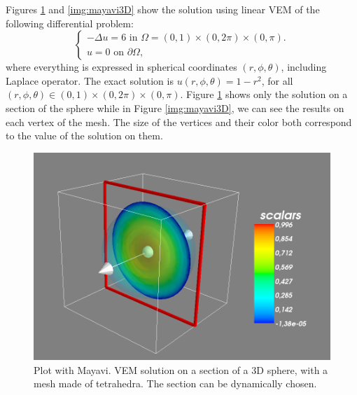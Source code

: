 Figures \ref{img:mayaviCoupe} and \ref{img:mayavi3D} show the solution using linear VEM of the following differential problem:
\begin{equation*}
\begin{cases}
-\Delta u = 6 \text{ in } \Omega=(0,1)\times (0,2\pi) \times (0,\pi).\\
u = 0 \text{ on } \partial \Omega,
\end{cases}
\end{equation*}
where everything is expressed in spherical coordinates $(r,\phi,\theta)$, including Laplace operator. The exact solution is $u(r,\phi,\theta)=1-r^2$, for all $(r,\phi,\theta)\in (0,1)\times (0,2\pi) \times (0,\pi)$. Figure \ref{img:mayaviCoupe} shows only the solution on a section of the sphere while in Figure \ref{img:mayavi3D}, we can see the results on each vertex of the mesh. The size of the vertices and their color both correspond to the value of the solution on them. 

\begin{figure}[!h]
\centering
\includegraphics[scale=0.35]{images/mayavi3D.png}
\caption{Plot with Mayavi. VEM solution on a section of a $3$D sphere, with a mesh made of tetrahedra. The section can be dynamically chosen.}
\label{img:mayaviCoupe}
\end{figure}

